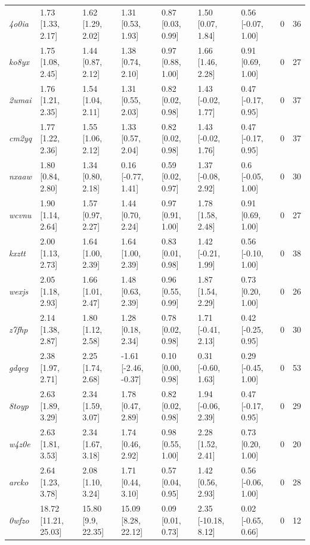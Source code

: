 \documentclass[9pt,lineno,final]{elife}
\begin{document}
\begin{table}[tb!]
\begin{center}
\begin{threeparttable}
\begin{tabular}{@{}lllllllll@{}}
\textit{4o0ia} & 1.73 [1.33, 2.17] & 1.62 [1.29, 2.02] & 1.31 [0.53, 1.93] & 0.87 [0.03, 0.99] & 1.50 [0.07, 1.84] & 0.56 [-0.07, 1.00] & 0 & 36 \\
\textit{ko8yx} & 1.75 [1.08, 2.45] & 1.44 [0.87, 2.12] & 1.38 [0.74, 2.10] & 0.97 [0.88, 1.00] & 1.66 [1.46, 2.28] & 0.91 [0.69, 1.00] & 0 & 27 \\
\textit{2umai} & 1.76 [1.21, 2.35] & 1.54 [1.04, 2.11] & 1.31 [0.55, 2.03] & 0.82 [0.02, 0.98] & 1.43 [-0.02, 1.77] & 0.47 [-0.17, 0.95] & 0 & 37 \\
\textit{cm2yq} & 1.77 [1.22, 2.36] & 1.55 [1.06, 2.12] & 1.33 [0.57, 2.04] & 0.82 [0.02, 0.98] & 1.43 [-0.02, 1.76] & 0.47 [-0.17, 0.95] & 0 & 37 \\
\textit{nxaaw} & 1.80 [0.84, 2.80] & 1.34 [0.80, 2.18] & 0.16 [-0.77, 1.41] & 0.59 [0.02, 0.97] & 1.37 [-0.08, 2.92] & 0.6 [-0.05, 1.00] & 0 & 30 \\
\textit{wcvnu} & 1.90 [1.14, 2.64] & 1.57 [0.97, 2.27] & 1.44 [0.70, 2.24] & 0.97 [0.91, 1.00] & 1.78 [1.58, 2.48] & 0.91 [0.69, 1.00] & 0 & 27 \\
\textit{kxztt} & 2.00 [1.13, 2.73] & 1.64 [1.00, 2.39] & 1.64 [1.00, 2.39] & 0.83 [0.01, 0.98] & 1.42 [-0.21, 1.99] & 0.56 [-0.10, 1.00] & 0 & 38 \\
\textit{wexjs} & 2.05 [1.18, 2.93] & 1.66 [1.01, 2.47] & 1.48 [0.63, 2.39] & 0.96 [0.55, 0.99] & 1.87 [1.54, 2.29] & 0.73 [0.20, 1.00] & 0 & 26 \\
\textit{z7fhp} & 2.14 [1.38, 2.87] & 1.80 [1.12, 2.58] & 1.28 [0.18, 2.34] & 0.78 [0.02, 0.98] & 1.71 [-0.41, 2.13] & 0.42 [-0.25, 0.95] & 0 & 30 \\
\textit{gdqeg} & 2.38 [1.97, 2.71] & 2.25 [1.74, 2.68] & -1.61 [-2.46, -0.37] & 0.10 [0.00, 0.98] & 0.31 [-0.60, 1.63] & 0.29 [-0.45, 1.00] & 0 & 53 \\
\textit{8toyp} & 2.63 [1.89, 3.29] & 2.34 [1.59, 3.07] & 1.78 [0.47, 2.89] & 0.82 [0.02, 0.98] & 1.94 [-0.06, 2.39] & 0.47 [-0.17, 0.95] & 0 & 29 \\
\textit{w4z0e} & 2.63 [1.81, 3.53] & 2.34 [1.67, 3.18] & 1.74 [0.46, 2.92] & 0.98 [0.55, 1.00] & 2.28 [1.52, 2.41] & 0.73 [0.20, 1.00] & 0 & 20 \\
\textit{arcko} & 2.64 [1.23, 3.78] & 2.08 [1.10, 3.24] & 1.71 [0.44, 3.10] & 0.57 [0.04, 0.95] & 1.42 [0.56, 2.93] & 0.56 [-0.06, 1.00] & 0 & 28 \\
\textit{0wfzo} & 18.72 [11.21, 25.03] & 15.80 [9.9, 22.35] & 15.09 [8.28, 22.12] & 0.09 [0.01, 0.73] & 2.35 [-10.18, 8.12] & 0.02 [-0.65, 0.66] & 0 & 12 \\

\end{tabular}
\end{threeparttable}
\end{center}
\end{table}
\end{document}

